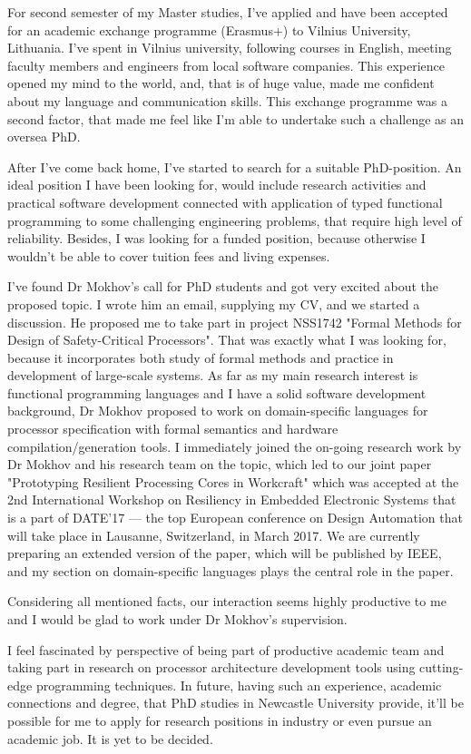 \documentclass[11pt,a4paper,sans]{moderncv} %
\begin{document}
For second semester of my Master studies, I've applied and have been accepted 
for an academic exchange programme (Erasmus+) to Vilnius University, Lithuania. 
I've spent  in Vilnius university, following courses in English, meeting 
faculty members and engineers from local software companies. This experience 
opened my mind to the world, and, that is of huge value, made me confident 
about my language and communication skills. This exchange programme was a second
factor, that made me feel like I'm able to undertake such a challenge as an 
oversea PhD.

After I've come back home, I've started to search for a suitable PhD-position.
An ideal position I have been looking for, would include research activities
and practical software development connected with application of typed 
functional programming to some challenging engineering problems, that require
high level of reliability. Besides, I was looking for a funded position, because
otherwise I wouldn't be able to cover tuition fees and living expenses.

I've found Dr Mokhov's call for PhD students and got very excited about the 
proposed topic. I wrote him an email, supplying my CV, and we started a 
discussion. He proposed me to take part in project NSS1742 "Formal Methods for 
Design of Safety-Critical Processors". That was exactly what I was looking for, 
because it incorporates both study of formal methods and practice in development
of large-scale systems. As far as my main research interest is functional
programming languages and I have a solid software development background,
Dr Mokhov proposed to work on domain-specific languages for processor
specification with formal semantics and hardware compilation/generation tools.
I immediately joined the on-going research work by Dr Mokhov and his research
team on the topic, which led to our joint paper "Prototyping Resilient 
Processing Cores in Workcraft" which was accepted at the 2nd International
Workshop on Resiliency in Embedded Electronic Systems that is a part of DATE'17
--- the top European conference on Design Automation that will take place in
Lausanne, Switzerland, in March 2017. We are currently preparing an extended
version of the paper, which will be published by IEEE, and my section
on domain-specific languages plays the central role in the paper.

Considering all mentioned facts, our interaction seems highly productive to me
and I would be glad to work under Dr Mokhov's supervision.

I feel fascinated by perspective of being part of productive academic team and
taking part in research on processor architecture development tools 
using cutting-edge programming techniques. In future, having such an experience, 
academic connections and degree, that PhD studies in Newcastle University 
provide, it'll be possible for me to apply for research positions in industry or
even pursue an academic job. It is yet to be decided.

\makeletterclosing %

\end{document}
